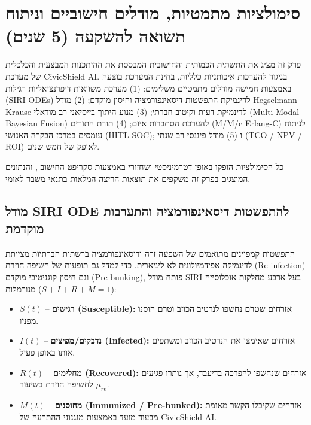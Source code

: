 \chapter{סימולציות מתמטיות, מודלים חישוביים וניתוח תשואה להשקעה (5 שנים)}
\label{ch:simulations}

פרק זה מציג את התשתית הכמותית והחישובית המבססת את ההיתכנות המבצעית והכלכלית של מערכת \textenglish{CivicShield AI}. בניגוד להערכות איכותניות כלליות, בחינת המערכת בוצעה באמצעות חמישה מודלים מתמטיים משלימים: (1) מערכת משוואות דיפרנציאליות רגילות (\textenglish{SIRI ODEs}) לדינמיקת התפשטות דיסאינפורמציה וחיסון מוקדם; (2) מודל \textenglish{Hegselmann-Krause} לדינמיקת דעות וקיטוב חברתי; (3) מנוע היתוך בייסיאני רב-מודאלי (\textenglish{Multi-Modal Bayesian Fusion}) להערכת הסתברות איום; (4) תורת התורים (\textenglish{M/M/c Erlang-C}) לניתוח עומסים במרכז הבקרה האנושי (\textenglish{HITL SOC}); ו-(5) מודל פיננסי רב-שנתי (\textenglish{TCO / NPV / ROI}) לאופק של חמש שנים.

כל הסימולציות הופקו באופן דטרמיניסטי ושחזורי באמצעות סקריפט החישוב , והנתונים המוצגים בפרק זה משקפים את תוצאות הריצה המלאות בתנאי משבר לאומי.

\section{מודל \textenglish{SIRI ODE} להתפשטות דיסאינפורמציה והתערבות מוקדמת}
\label{sec:siri_model}

התפשטות קמפיינים מתואמים של השפעה זרה ודיסאינפורמציה ברשתות חברתיות מצייתת לדינמיקה אפידמיולוגית לא-ליניארית. כדי למדל גם תופעות של חשיפה חוזרת (\textenglish{Re-infection}) וגם חיסון קוגניטיבי מוקדם (\textenglish{Pre-bunking}), פותח מודל \textenglish{SIRI} בעל ארבע מחלקות אוכלוסייה מנורמלות ($S + I + R + M = 1$):
\begin{itemize}
    \item $S(t)$ -- \textbf{רגישים (\textenglish{Susceptible}):} אזרחים שטרם נחשפו לנרטיב הכוזב וטרם חוסנו מפניו.
    \item $I(t)$ -- \textbf{נדבקים/מפיצים (\textenglish{Infected}):} אזרחים שאימצו את הנרטיב הכוזב ומשתפים אותו באופן פעיל.
    \item $R(t)$ -- \textbf{מחלימים (\textenglish{Recovered}):} אזרחים שנחשפו להפרכה בדיעבד, אך נותרו פגיעים לחשיפה חוזרת בשיעור $\mu_{re}$.
    \item $M(t)$ -- \textbf{מחוסנים (\textenglish{Immunized / Pre-bunked}):} אזרחים שקיבלו הקשר מאומת מבעוד מועד באמצעות מנגנוני ההתרעה של \textenglish{CivicShield AI}.
\end{itemize}

